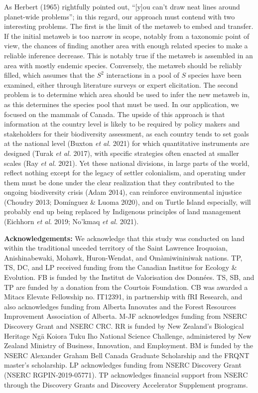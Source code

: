 \documentclass[11pt]{article}
\begin{document}
As Herbert (1965) rightfully pointed out, ``{[}y{]}ou can't draw neat
lines around planet-wide problems''; in this regard, our approach must
contend with two interesting problems. The first is the limit of the
metaweb to embed and transfer. If the initial metaweb is too narrow in
scope, notably from a taxonomic point of view, the chances of finding
another area with enough related species to make a reliable inference
decrease. This is notably true if the metaweb is assembled in an area
with mostly endemic species. Conversely, the metaweb should be reliably
filled, which assumes that the \(S^2\) interactions in a pool of \(S\)
species have been examined, either through literature surveys or expert
elicitation. The second problem is to determine which area should be
used to infer the new metaweb in, as this determines the species pool
that must be used. In our application, we focused on the mammals of
Canada. The upside of this approach is that information at the country
level is likely to be required by policy makers and stakeholders for
their biodiversity assessment, as each country tends to set goals at the
national level (Buxton \emph{et al.} 2021) for which quantitative
instruments are designed (Turak \emph{et al.} 2017), with specific
strategies often enacted at smaller scales (Ray \emph{et al.} 2021). Yet
these national divisions, in large parts of the world, reflect nothing
except for the legacy of settler colonialism, and operating under them
must be done under the clear realization that they contributed to the
ongoing biodiversity crisis (Adam 2014), can reinforce environmental
injustice (Choudry 2013; Domínguez \& Luoma 2020), and on Turtle Island
especially, will probably end up being replaced by Indigenous principles
of land management (Eichhorn \emph{et al.} 2019; No'kmaq \emph{et al.}
2021).

\textbf{Acknowledgements:} We acknowledge that this study was conducted
on land within the traditional unceded territory of the Saint Lawrence
Iroquoian, Anishinabewaki, Mohawk, Huron-Wendat, and Omàmiwininiwak
nations. TP, TS, DC, and LP received funding from the Canadian Institue
for Ecology \& Evolution. FB is funded by the Institut de Valorisation
des Données. TS, SB, and TP are funded by a donation from the Courtois
Foundation. CB was awarded a Mitacs Elevate Fellowship no. IT12391, in
partnership with fRI Research, and also acknowledges funding from
Alberta Innovates and the Forest Resources Improvement Association of
Alberta. M-JF acknowledges funding from NSERC Discovery Grant and NSERC
CRC. RR is funded by New Zealand's Biological Heritage Ngā Koiora Tuku
Iho National Science Challenge, administered by New Zealand Ministry of
Business, Innovation, and Employment. BM is funded by the NSERC
Alexander Graham Bell Canada Graduate Scholarship and the FRQNT master's
scholarship. LP acknowledges funding from NSERC Discovery Grant (NSERC
RGPIN-2019-05771). TP acknowledges financial support from NSERC through
the Discovery Grants and Discovery Accelerator Supplement programs.
\end{document}
